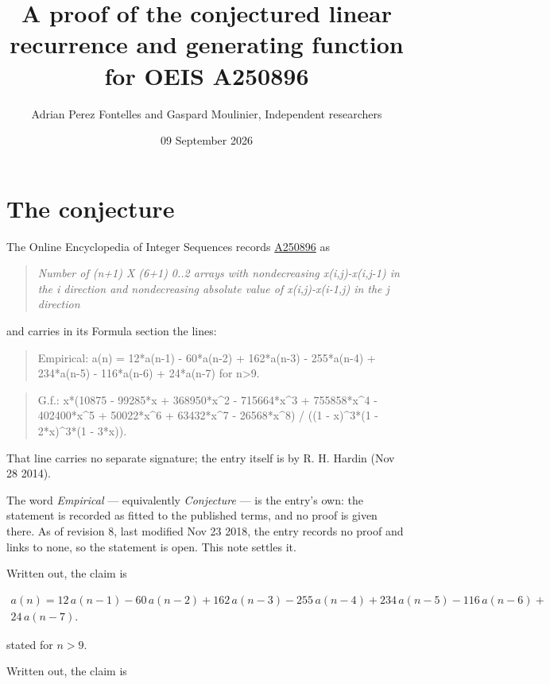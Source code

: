 \documentclass[11pt]{article}
\title{A proof of the conjectured linear recurrence and generating function for OEIS A250896}
\author{Adrian Perez Fontelles and Gaspard Moulinier, Independent researchers}
\date{09 September 2026}
\theoremstyle{definition}
\begin{document}
\maketitle
\section{The conjecture}

The Online Encyclopedia of Integer Sequences records \href{https://oeis.org/A250896}{A250896} as

\begin{quote}\itshape Number of (n+1) X (6+1) 0..2 arrays with nondecreasing x(i,j)-x(i,j-1) in the i direction and nondecreasing absolute value of x(i,j)-x(i-1,j) in the j direction\end{quote}

and carries in its Formula section the lines:

\begin{quote}\ttfamily Empirical: a(n) = 12*a(n-1) - 60*a(n-2) + 162*a(n-3) - 255*a(n-4) + 234*a(n-5) - 116*a(n-6) + 24*a(n-7) for n>9.\end{quote}

\begin{quote}\ttfamily G.f.: x*(10875 - 99285*x + 368950*x\textasciicircum{}2 - 715664*x\textasciicircum{}3 + 755858*x\textasciicircum{}4 - 402400*x\textasciicircum{}5 + 50022*x\textasciicircum{}6 + 63432*x\textasciicircum{}7 - 26568*x\textasciicircum{}8) / ((1 - x)\textasciicircum{}3*(1 - 2*x)\textasciicircum{}3*(1 - 3*x)).\end{quote}

That line carries no separate signature; the entry itself is by R. H. Hardin (Nov 28 2014).

The word {\itshape Empirical} --- equivalently {\itshape Conjecture} --- is the entry's own: the statement is recorded as fitted to the published terms, and no proof is given there. As of revision 8, last modified Nov 23 2018, the entry records no proof and links to none, so the statement is open. This note settles it.

Written out, the claim is

\begin{multline*} a(n) = 12\,a(n-1) - 60\,a(n-2) + 162\,a(n-3) - 255\,a(n-4) + 234\,a(n-5) - 116\,a(n-6) + \\ 24\,a(n-7). \end{multline*}

stated for $n > 9$.

Written out, the claim is
\end{document}
